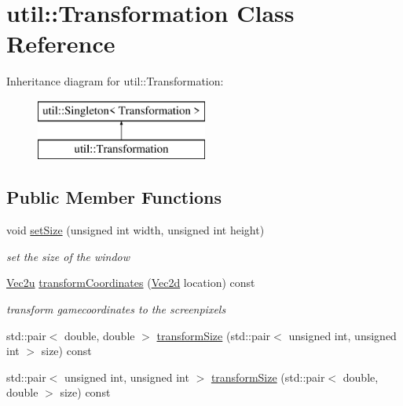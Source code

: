 \hypertarget{classutil_1_1_transformation}{}\section{util\+:\+:Transformation Class Reference}
\label{classutil_1_1_transformation}
Inheritance diagram for util\+:\+:Transformation\+:\begin{figure}[H]
\begin{center}
\leavevmode
\includegraphics[height=2.000000cm]{db/dc5/classutil_1_1_transformation}
\end{center}
\end{figure}
\subsection*{Public Member Functions}
\begin{DoxyCompactItemize}
\item 
void \mbox{\hyperlink{classutil_1_1_transformation_a60ea3879083f58bb7edde16976e9fcc2}{set\+Size}} (unsigned int width, unsigned int height)
\begin{DoxyCompactList}\small\item\em set the size of the window \end{DoxyCompactList}\item 
\mbox{\hyperlink{classutil_1_1_vec2}{Vec2u}} \mbox{\hyperlink{classutil_1_1_transformation_ab13ab300ab42b732ea2b1d301bed122a}{transform\+Coordinates}} (\mbox{\hyperlink{classutil_1_1_vec2}{Vec2d}} location) const
\begin{DoxyCompactList}\small\item\em transform gamecoordinates to the screenpixels \end{DoxyCompactList}\item 
std\+::pair$<$ double, double $>$ \mbox{\hyperlink{classutil_1_1_transformation_a7d6caddc65a3fa10fa98555dc3f96ea5}{transform\+Size}} (std\+::pair$<$ unsigned int, unsigned int $>$ size) const
\item 
std\+::pair$<$ unsigned int, unsigned int $>$ \mbox{\hyperlink{classutil_1_1_transformation_aedd442f8fde937eec692f4f07c2d7861}{transform\+Size}} (std\+::pair$<$ double, double $>$ size) const
\end{DoxyCompactItemize}
